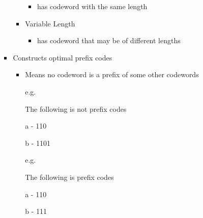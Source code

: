 \documentclass[12pt]{article}
\begin{document}
\begin{enumerate}[1.]
\begin{itemize}
\begin{itemize}
\begin{itemize}
                \begin{itemize}
                    \item has codeword with the same length
                \end{itemize}

                \item Variable Length
                \begin{itemize}
                    \item has codeword that may be of different lengths
                \end{itemize}
            \end{itemize}
            \item Constructs optimal prefix codes

            \begin{itemize}
                \item Means no codeword is a prefix of some other codewords

                \bigskip

                e.g.

                The following is not prefix codes

                \bigskip

                a - 110

                b - 1101

                \bigskip

                e.g.

                The following is prefix codes

                \bigskip

                a - 110

                b - 111

                \bigskip
            \end{itemize}
        \end{itemize}
    \end{itemize}

\end{enumerate}
\end{document}
